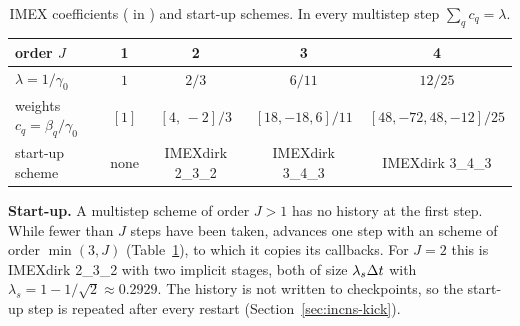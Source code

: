 \begin{table}[htbp]
\centering
\small
\begin{tabular}{@{}lcccc@{}}
\toprule
order $J$ & 1 & 2 & 3 & 4 \\
\midrule
$\lambda=1/\gamma_0$ & $1$ & $2/3$ & $6/11$ & $12/25$ \\
weights $c_q=\beta_q/\gamma_0$ & $[1]$ & $[4,\,-2]/3$ &
$[18,-18,6]/11$ & $[48,-72,48,-12]/25$ \\
start-up scheme & none & IMEXdirk 2\_3\_2 & IMEXdirk 3\_4\_3 &
IMEXdirk 3\_4\_3 \\
\bottomrule
\end{tabular}
\caption{IMEX coefficients ( in
) and start-up schemes. In every multistep step
$\sum_q c_q=\lambda$.}
\label{tab:incns-imex}
\end{table}

\textbf{Start-up.} A multistep scheme of order $J>1$ has no history at
the first step. While fewer than $J$ steps have been taken,
 advances one step with an  scheme
of order $\min(3,J)$ (Table~\ref{tab:incns-imex}), to which it copies its
callbacks. For $J=2$ this is IMEXdirk 2\_3\_2 with two implicit stages, both
of size $\lambda_s\Delta t$ with $\lambda_s=1-1/\sqrt2\approx0.2929$. The
history is not written to checkpoints, so the start-up step is repeated after
every restart (Section~\ref{sec:incns-kick}).

